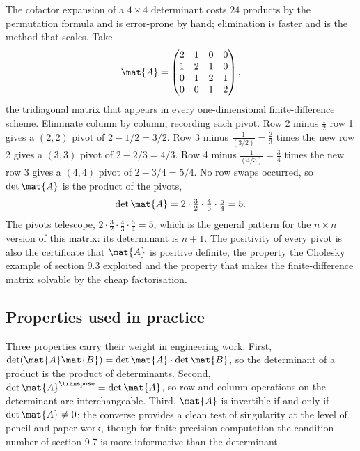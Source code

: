 \begin{example}
The cofactor expansion of a $4 \times 4$ determinant costs $24$
products by the permutation formula and is error-prone by hand;
elimination is faster and is the method that scales. Take
\[
\mat{A} = \begin{pmatrix}
2 & 1 & 0 & 0 \\
1 & 2 & 1 & 0 \\
0 & 1 & 2 & 1 \\
0 & 0 & 1 & 2
\end{pmatrix},
\]
the tridiagonal matrix that appears in every one-dimensional
finite-difference scheme. Eliminate column by column, recording each
pivot. Row 2 minus $\tfrac{1}{2}$ row 1 gives a $(2,2)$ pivot of
$2 - 1/2 = 3/2$. Row 3 minus $\tfrac{1}{(3/2)} = \tfrac{2}{3}$ times
the new row 2 gives a $(3,3)$ pivot of $2 - 2/3 = 4/3$. Row 4 minus
$\tfrac{1}{(4/3)} = \tfrac{3}{4}$ times the new row 3 gives a $(4,4)$
pivot of $2 - 3/4 = 5/4$. No row swaps occurred, so $\det \mat{A}$ is
the product of the pivots,
\[
\det \mat{A} = 2 \cdot \tfrac{3}{2} \cdot \tfrac{4}{3} \cdot
\tfrac{5}{4} = 5.
\]
The pivots telescope, $2 \cdot \tfrac{3}{2} \cdot \tfrac{4}{3} \cdot
\tfrac{5}{4} = 5$, which is the general pattern for the $n \times n$
version of this matrix: its determinant is $n + 1$. The positivity of
every pivot is also the certificate that $\mat{A}$ is positive
definite, the property the Cholesky example of section 9.3 exploited
and the property that makes the finite-difference matrix solvable by
the cheap factorisation.
\end{example}

\subsection{Properties used in practice}

Three properties carry their weight in engineering work. First,
$\det(\mat{A}\mat{B}) = \det \mat{A} \cdot \det \mat{B}$, so the
determinant of a product is the product of determinants. Second,
$\det \mat{A}^{\transpose} = \det \mat{A}$, so row and column
operations on the determinant are interchangeable. Third, $\mat{A}$
is invertible if and only if $\det \mat{A} \neq 0$; the converse
provides a clean test of singularity at the level of pencil-and-paper
work, though for finite-precision computation the condition number
of section 9.7 is more informative than the determinant.


